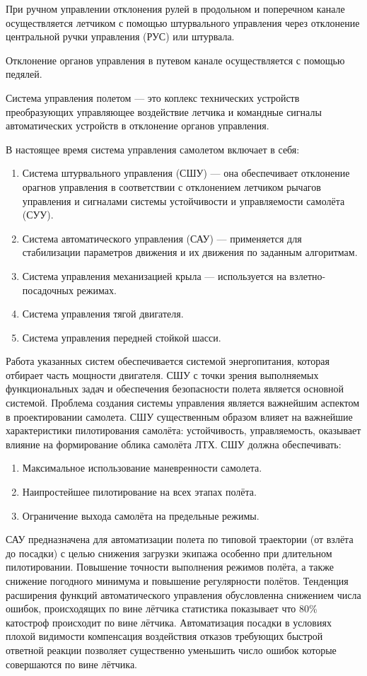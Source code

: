 \documentclass{article}
\begin{document}
При ручном управлении отклонения рулей в продольном и поперечном канале осуществляется летчиком с помощью штурвального управления через отклонение центральной ручки управления (РУС) или штурвала.

Отклонение органов управления в путевом канале осуществляется с помощью педялей.

Система управления полетом — это коплекс технических устройств преобразующих управляющее воздействие летчика и командные сигналы автоматических устройств в отклонение органов управления. 

В настоящее время система управления самолетом включает в себя:
\begin{enumerate}
  \item Система штурвального управления (СШУ) --- она обеспечивает отклонение орагнов управления в соответствии с отклонением летчиком рычагов управления и сигналами системы устойчивости и управляемости самолёта (СУУ).
  \item Система автоматического управления (САУ) --- применяется для стабилизации параметров движения и их движения по заданным алгоритмам.
  \item Система управления механизацией крыла --- используется на взлетно-посадочных режимах.
  \item Система управления тягой двигателя.
  \item Система управления передней стойкой шасси.
\end{enumerate}

Работа указанных систем обеспечивается системой энергопитания, которая отбирает часть мощности двигателя. СШУ с точки зрения выполняемых функциональных задач и обеспечения безопасности полета является основной системой. Проблема создания системы управления является важнейшим аспектом в проектировании самолета. СШУ существенным образом влияет на важнейшие характеристики пилотирования самолёта: устойчивость, управляемость, оказывает влияние на формирование облика самолёта ЛТХ. СШУ должна обеспечивать:
\begin{enumerate}
  \item Максимальное использование маневренности самолета.
  \item Наипростейшее пилотирование на всех этапах полёта.
  \item Ограничение выхода самолёта на предельные режимы.
\end{enumerate}

САУ предназначена для автоматизации полета по типовой траектории (от взлёта до посадки) с целью снижения загрузки экипажа особенно при длительном пилотировании. Повышение точности выполнения режимов полёта, а также снижение погодного минимума и повышение регулярности полётов. Тенденция расширения функций автоматического управления обусловленна снижением числа ошибок, происходящих по вине лётчика статистика показывает что 80\% катостроф происходит по вине лётчика. Автоматизация посадки в условиях плохой видимости компенсация воздействия отказов требующих быстрой ответной реакции позволяет существенно уменьшить число ошибок которые совершаются по вине лётчика.
\end{document}
